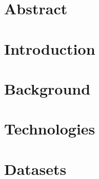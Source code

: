 \documentclass[english, a4paper, 11pt, twoside]{article}
\numberwithin{equation}{section} %
\def\biblio{\clearpage} %
\begin{document}


\def\biblio{} %


\restoregeometry %

\thispagestyle{plain} %

\clearpage\mbox{}\clearpage %

\newpage
\section*{Abstract}
    

\newpage
{ %
\tableofcontents
}

\newpage
{ 
\listoffigures}
 
\newpage
{ 
\listoftables}

\newpage
{} %
\setcounter{page}{1} %

\section{Introduction} %
\clearpage %

\section{Background}
    
\clearpage

\section{Technologies}
    
\clearpage

\section{Datasets}
    
\clearpage
\end{document}

